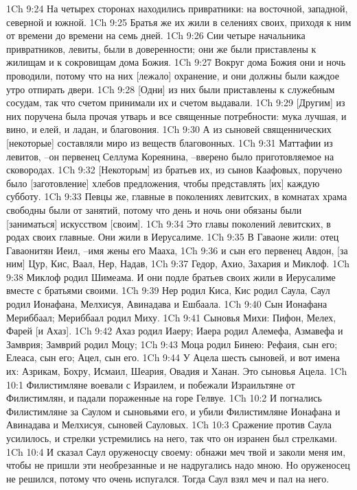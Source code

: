 1Ch 9:24  На четырех сторонах находились привратники: на восточной, западной, северной и южной.
1Ch 9:25  Братья же их жили в селениях своих, приходя к ним от времени до времени на семь дней.
1Ch 9:26  Сии четыре начальника привратников, левиты, были в доверенности; они же были приставлены к жилищам и к сокровищам дома Божия.
1Ch 9:27  Вокруг дома Божия они и ночь проводили, потому что на них [лежало] охранение, и они должны были каждое утро отпирать двери.
1Ch 9:28  [Одни] из них были приставлены к служебным сосудам, так что счетом принимали их и счетом выдавали.
1Ch 9:29  [Другим] из них поручена была прочая утварь и все священные потребности: мука лучшая, и вино, и елей, и ладан, и благовония.
1Ch 9:30  А из сыновей священнических [некоторые] составляли миро из веществ благовонных.
1Ch 9:31  Маттафии из левитов, --он первенец Селлума Кореянина, --вверено было приготовляемое на сковородах.
1Ch 9:32  [Некоторым] из братьев их, из сынов Каафовых, поручено было [заготовление] хлебов предложения, чтобы представлять [их] каждую субботу.
1Ch 9:33  Певцы же, главные в поколениях левитских, в комнатах храма свободны были от занятий, потому что день и ночь они обязаны были [заниматься] искусством [своим].
1Ch 9:34  Это главы поколений левитских, в родах своих главные. Они жили в Иерусалиме.
1Ch 9:35  В Гаваоне жили: отец Гаваонитян Иеил, --имя жены его Мааха,
1Ch 9:36  и сын его первенец Авдон, [за ним] Цур, Кис, Ваал, Нер, Надав,
1Ch 9:37  Гедор, Ахио, Захария и Миклоф.
1Ch 9:38  Миклоф родил Шимеама. И они подле братьев своих жили в Иерусалиме вместе с братьями своими.
1Ch 9:39  Нер родил Киса, Кис родил Саула, Саул родил Ионафана, Мелхисуя, Авинадава и Ешбаала.
1Ch 9:40  Сын Ионафана Мериббаал; Мериббаал родил Миху.
1Ch 9:41  Сыновья Михи: Пифон, Мелех, Фарей [и Ахаз].
1Ch 9:42  Ахаз родил Иаеру; Иаера родил Алемефа, Азмавефа и Замврия; Замврий родил Моцу;
1Ch 9:43  Моца родил Бинею: Рефаия, сын его; Елеаса, сын его; Ацел, сын его.
1Ch 9:44  У Ацела шесть сыновей, и вот имена их: Азрикам, Бохру, Исмаил, Шеария, Овадия и Ханан. Это сыновья Ацела.
1Ch 10:1  Филистимляне воевали с Израилем, и побежали Израильтяне от Филистимлян, и падали пораженные на горе Гелвуе.
1Ch 10:2  И погнались Филистимляне за Саулом и сыновьями его, и убили Филистимляне Ионафана и Авинадава и Мелхисуя, сыновей Сауловых.
1Ch 10:3  Сражение против Саула усилилось, и стрелки устремились на него, так что он изранен был стрелками.
1Ch 10:4  И сказал Саул оруженосцу своему: обнажи меч твой и заколи меня им, чтобы не пришли эти необрезанные и не надругались надо мною. Но оруженосец не решился, потому что очень испугался. Тогда Саул взял меч и пал на него.
